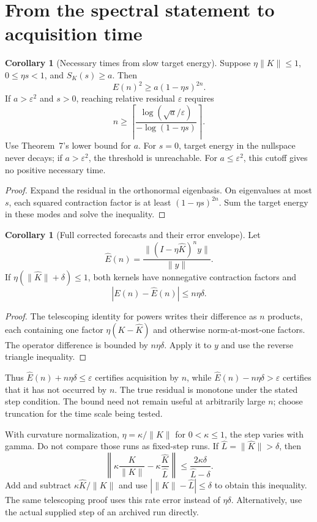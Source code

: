 \documentclass[11pt]{article}
\theoremstyle{definition}
\newtheorem{corollary}[lemma]{Corollary}
\begin{document}
\section{From the spectral statement to acquisition time}
\begin{corollary}[Necessary times from slow target energy]
Suppose $\eta\|K\|\le1$, $0\le\eta s<1$, and $S_K(s)\ge a$. Then
\[
E(n)^2\ge a(1-\eta s)^{2n}.
\]
If $a>\varepsilon^2$ and $s>0$, reaching relative residual $\varepsilon$
requires
\[
n\ge\left\lceil
\frac{\log(\sqrt a/\varepsilon)}{-\log(1-\eta s)}
\right\rceil.
\]
Use Theorem~7's lower bound for $a$. For $s=0$, target energy in the
nullspace never decays; if $a>\varepsilon^2$, the threshold is unreachable.
For $a\le\varepsilon^2$, this cutoff gives no positive necessary time.
\end{corollary}
\begin{proof}
Expand the residual in the orthonormal eigenbasis. On eigenvalues at most
$s$, each squared contraction factor is at least $(1-\eta s)^{2n}$.
Sum the target energy in these modes and solve the inequality.
\end{proof}

\begin{corollary}[Full corrected forecasts and their error envelope]
Let
\[
\widehat E(n)=\frac{\|(I-\eta\widehat K)^ny\|}{\|y\|}.
\]
If $\eta(\|\widehat K\|+\delta)\le1$, both kernels have nonnegative
contraction factors and
\[
|E(n)-\widehat E(n)|\le n\eta\delta.
\]
\end{corollary}
\begin{proof}
The telescoping identity for powers writes their difference as $n$ products,
each containing one factor $\eta(K-\widehat K)$ and otherwise
norm-at-most-one factors. The operator difference is bounded by $n\eta\delta$.
Apply it to $y$ and use the reverse triangle inequality.
\end{proof}
Thus $\widehat E(n)+n\eta\delta\le\varepsilon$ certifies acquisition by $n$,
while $\widehat E(n)-n\eta\delta>\varepsilon$ certifies that it has not
occurred by $n$. The true residual is monotone under the stated step
condition. The bound need not remain useful at arbitrarily large $n$;
choose truncation for the time scale being tested.

With curvature normalization, $\eta=\kappa/\|K\|$ for $0<\kappa\le1$,
the step varies with gamma. Do not compare those runs as fixed-step runs.
If $\widehat L=\|\widehat K\|>\delta$, then
\[
\left\|\kappa\frac K{\|K\|}
-\kappa\frac{\widehat K}{\widehat L}\right\|
\le\frac{2\kappa\delta}{\widehat L-\delta}.
\]
Add and subtract $\kappa\widehat K/\|K\|$ and use
$|\|K\|-\widehat L|\le\delta$ to obtain this inequality.
The same telescoping proof uses this rate error instead of $\eta\delta$.
Alternatively, use the actual supplied step of an archived run directly.
\end{document}
